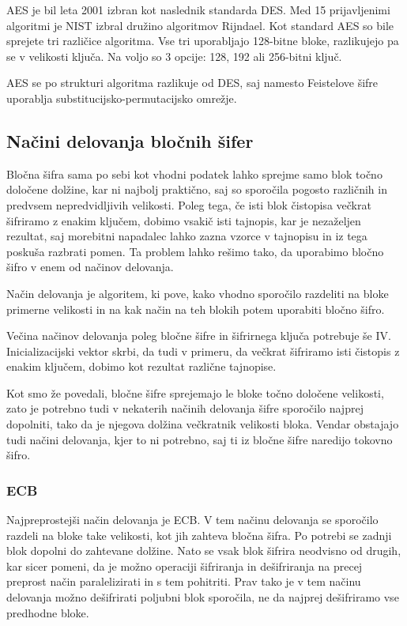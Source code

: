 \documentclass[12pt,a4paper,openany,tikz]{book}
\theoremstyle{plain}
\theoremstyle{definition}
\begin{document}
\gls{AES} je bil leta 2001 izbran kot naslednik standarda \gls{DES}. Med 15 prijavljenimi algoritmi je \acrshort{NIST} izbral družino algoritmov Rijndael. Kot standard \gls{AES} so bile sprejete tri različice algoritma. Vse tri uporabljajo 128-bitne bloke, razlikujejo pa se v velikosti ključa. Na voljo so 3 opcije: 128, 192 ali 256-bitni ključ.

\gls{AES} se po strukturi algoritma razlikuje od \gls{DES}, saj namesto Feistelove šifre uporablja substitucijsko-permutacijsko omrežje.

\subsection*{Načini delovanja bločnih šifer}
\label{sub:Nacini delovanja blocnih sifer}

Bločna šifra sama po sebi kot vhodni podatek lahko sprejme samo blok točno določene dolžine, kar ni najbolj praktično, saj so sporočila pogosto različnih in predvsem nepredvidljivih velikosti. Poleg tega, če isti blok čistopisa večkrat šifriramo z enakim ključem, dobimo vsakič isti tajnopis, kar je nezaželjen rezultat, saj morebitni napadalec lahko zazna vzorce v tajnopisu in iz tega poskuša razbrati pomen. Ta problem lahko rešimo tako, da uporabimo bločno šifro v enem od načinov delovanja.

Način delovanja je algoritem, ki pove, kako vhodno sporočilo razdeliti na bloke primerne velikosti in na kak način na teh blokih potem uporabiti bločno šifro.

Večina načinov delovanja poleg bločne šifre in šifrirnega ključa potrebuje še \gls{IV}. Inicializacijski vektor skrbi, da tudi v primeru, da večkrat šifriramo isti čistopis z enakim ključem, dobimo kot rezultat različne tajnopise.

Kot smo že povedali, bločne šifre sprejemajo le bloke točno določene velikosti, zato je potrebno tudi v nekaterih načinih delovanja šifre sporočilo najprej dopolniti, tako da je njegova dolžina večkratnik velikosti bloka. Vendar obstajajo tudi načini delovanja, kjer to ni potrebno, saj ti iz bločne šifre naredijo tokovno šifro.


\subsubsection{ECB}
\label{subs:ECB}

Najpreprostejši način delovanja je \gls{ECB}. V tem načinu delovanja se sporočilo razdeli na bloke take velikosti, kot jih zahteva bločna šifra. Po potrebi se zadnji blok dopolni do zahtevane dolžine. Nato se vsak blok šifrira neodvisno od drugih, kar sicer pomeni, da je možno operaciji šifriranja in dešifriranja na precej preprost način paralelizirati in s tem pohitriti. Prav tako je v tem načinu delovanja možno dešifrirati poljubni blok sporočila, ne da najprej dešifriramo vse predhodne bloke.
\end{document}
